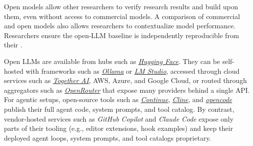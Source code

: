 Open models allow other researchers to verify research results and build upon them, even without access to commercial models.
A comparison of commercial and open models also allows researchers to contextualize model performance.
Researchers \should ensure the open-LLM baseline is independently reproducible from their \supplementarymaterial.

Open LLMs are available from hubs such as \href{https://huggingface.co/}{\emph{Hugging Face}}. They can be self-hosted with frameworks such as \href{https://ollama.com/}{\emph{Ollama}} or \href{https://lmstudio.ai/}{\emph{LM Studio}}, accessed through cloud services such as \href{https://together.ai/}{\emph{Together AI}}, AWS, Azure, and Google Cloud, or routed through aggregators such as \href{https://openrouter.ai/}{\emph{OpenRouter}} that expose many providers behind a single API. For agentic setups, open-source tools such as \href{https://www.continue.dev/}{\emph{Continue}}, \href{https://cline.bot/}{\emph{Cline}}, and \href{https://opencode.ai/}{\emph{opencode}}~\cite{opencode} publish their full agent code, system prompts, and tool catalog. By contrast, vendor-hosted services such as \emph{GitHub Copilot} and \emph{Claude Code} expose only parts of their tooling (e.g., editor extensions, hook examples) and keep their deployed agent loops, system prompts, and tool catalogs proprietary.


